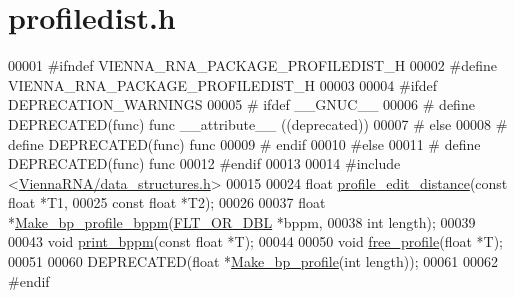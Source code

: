 \hypertarget{profiledist_8h_source}{\section{profiledist.\+h}
\label{profiledist_8h_source}
}

\begin{DoxyCode}
00001 \textcolor{preprocessor}{#ifndef VIENNA\_RNA\_PACKAGE\_PROFILEDIST\_H}
00002 \textcolor{preprocessor}{#define VIENNA\_RNA\_PACKAGE\_PROFILEDIST\_H}
00003 
00004 \textcolor{preprocessor}{#ifdef DEPRECATION\_WARNINGS}
00005 \textcolor{preprocessor}{# ifdef \_\_GNUC\_\_}
00006 \textcolor{preprocessor}{#  define DEPRECATED(func) func \_\_attribute\_\_ ((deprecated))}
00007 \textcolor{preprocessor}{# else}
00008 \textcolor{preprocessor}{#  define DEPRECATED(func) func}
00009 \textcolor{preprocessor}{# endif}
00010 \textcolor{preprocessor}{#else}
00011 \textcolor{preprocessor}{# define DEPRECATED(func) func}
00012 \textcolor{preprocessor}{#endif}
00013 
00014 \textcolor{preprocessor}{#include <\hyperlink{data__structures_8h}{ViennaRNA/data\_structures.h}>}
00015 
00024 \textcolor{keywordtype}{float} \hyperlink{profiledist_8h_abe75e90e00a1e5dd8862944ed53dad5d}{profile\_edit\_distance}(\textcolor{keyword}{const} \textcolor{keywordtype}{float} *T1,
00025                             \textcolor{keyword}{const} \textcolor{keywordtype}{float} *T2);
00026 
00037 \textcolor{keywordtype}{float} *\hyperlink{profiledist_8h_a3dff26e707a2a2e65a0f759caabde6e7}{Make\_bp\_profile\_bppm}(\hyperlink{group__data__structures_ga31125aeace516926bf7f251f759b6126}{FLT\_OR\_DBL} *bppm,
00038                             \textcolor{keywordtype}{int} length);
00039 
00043 \textcolor{keywordtype}{void}  \hyperlink{profiledist_8h_a8e0b4fe3698b3502945116ecc0ba6160}{print\_bppm}(\textcolor{keyword}{const} \textcolor{keywordtype}{float} *T);
00044 
00050 \textcolor{keywordtype}{void}  \hyperlink{profiledist_8h_a9b0b84a5a45761bf42d7c835dcdb3b85}{free\_profile}(\textcolor{keywordtype}{float} *T);
00051 
00060 DEPRECATED(\textcolor{keywordtype}{float} *\hyperlink{profiledist_8h_a904c7eaf4a2413567c00ac4891749d18}{Make\_bp\_profile}(\textcolor{keywordtype}{int} length));
00061 
00062 \textcolor{preprocessor}{#endif}
\end{DoxyCode}
